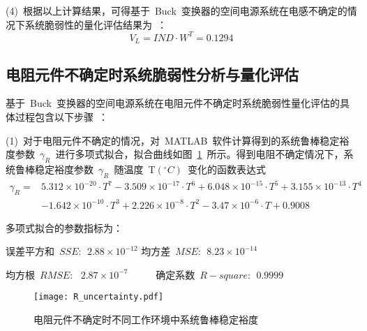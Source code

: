 (4)~根据以上计算结果，可得基于~Buck~变换器的空间电源系统在电感不确定的情况下系统脆弱性的量化评估结果为~：
\begin{equation}\label{equ:chap5:Index38}
V_L=IND\cdot W^T=0.1294
\end{equation}
\subsection{电阻元件不确定时系统脆弱性分析与量化评估}
基于~Buck~变换器的空间电源系统在电阻元件不确定时系统脆弱性量化评估的具体过程包含以下步骤~：

(1)~对于电阻元件不确定的情况，对~MATLAB~软件计算得到的系统鲁棒稳定裕度参数~$\gamma_R$~进行多项式拟合，拟合曲线如图~\ref{fig:chap5:runcertainty}~所示。得到电阻不确定情况下，系统鲁棒稳定裕度参数~$\gamma_R$~随温度~T$\left(^{\circ}C\right)$~变化的函数表达式
\begin{equation}\label{equ:chap5:Index39}
\begin{split}
   \gamma_R= &5.312\times10^{-20}\cdot T^7-3.509\times10^{-17}\cdot T^6+6.048\times10^{-15}\cdot T^5+3.155\times10^{-13}\cdot T^4\\
     & -1.642\times10^{-10}\cdot T^3+2.226\times10^{-8}\cdot T^2-3.47\times10^{-6}\cdot T+0.9008
\end{split}
\end{equation}

多项式拟合的参数指标为：

\qquad 误差平方和~$SSE\colon~~2.88\times10^{-12}$  \qquad 均方差~$MSE\colon~~8.23\times10^{-14} $

\qquad 均方根~$RMSE\colon~~~2.87\times10^{-7}$    ~~~~~\qquad 确定系数~$R-square\colon~~0.9999$

\iffalse
\begin{table}[htbp]
  \centering
\begin{tabular}{p{5cm}p{5cm}}

  误差平方和~$SSE\colon~~2.88\times10^{-12}$     &~~均方差~$MSE\colon~~8.23\times10^{-14} $\\

  均方根~$RMSE\colon~~2.87\times10^{-7}$           &~~确定系数~$R-square\colon~~0.9999$ \\
\end{tabular}
\end{table}
\fi
\begin{figure}[h]
  \centering
     \texttt{[image: R\_uncertainty.pdf]}\\
     \medskip
  \caption{电阻元件不确定时不同工作环境中系统鲁棒稳定裕度}\label{fig:chap5:runcertainty}
\end{figure}

